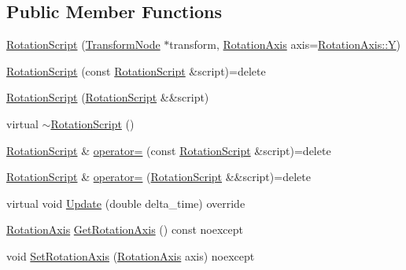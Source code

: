 \subsection*{Public Member Functions}
\begin{DoxyCompactItemize}
\item 
\hyperlink{classmage_1_1_rotation_script_a731c7c3dbe7064fe876f80307952b595}{Rotation\+Script} (\hyperlink{structmage_1_1_transform_node}{Transform\+Node} $\ast$transform, \hyperlink{classmage_1_1_rotation_script_ad06cf896ce6dfe4f6676b263d15b4ee9}{Rotation\+Axis} axis=\hyperlink{classmage_1_1_rotation_script_ad06cf896ce6dfe4f6676b263d15b4ee9a57cec4137b614c87cb4e24a3d003a3e0}{Rotation\+Axis\+::Y})
\item 
\hyperlink{classmage_1_1_rotation_script_a52ee0473609565766fc1153678ee8b60}{Rotation\+Script} (const \hyperlink{classmage_1_1_rotation_script}{Rotation\+Script} \&script)=delete
\item 
\hyperlink{classmage_1_1_rotation_script_a5c6464f8e38fde0442c3b6f49a9cbed1}{Rotation\+Script} (\hyperlink{classmage_1_1_rotation_script}{Rotation\+Script} \&\&script)
\item 
virtual \hyperlink{classmage_1_1_rotation_script_adc2af2d6ed93558fd66b569297b294d0}{$\sim$\+Rotation\+Script} ()
\item 
\hyperlink{classmage_1_1_rotation_script}{Rotation\+Script} \& \hyperlink{classmage_1_1_rotation_script_a738c666a1aa42412da82d24368b20dfe}{operator=} (const \hyperlink{classmage_1_1_rotation_script}{Rotation\+Script} \&script)=delete
\item 
\hyperlink{classmage_1_1_rotation_script}{Rotation\+Script} \& \hyperlink{classmage_1_1_rotation_script_a093aa3f50dcbbe68847bb0b5f6363e7a}{operator=} (\hyperlink{classmage_1_1_rotation_script}{Rotation\+Script} \&\&script)=delete
\item 
virtual void \hyperlink{classmage_1_1_rotation_script_a96936107b1b955cce5e84b8081f930bb}{Update} (double delta\+\_\+time) override
\item 
\hyperlink{classmage_1_1_rotation_script_ad06cf896ce6dfe4f6676b263d15b4ee9}{Rotation\+Axis} \hyperlink{classmage_1_1_rotation_script_a6fbbbec1bd610da2c917d1ef2d05f556}{Get\+Rotation\+Axis} () const noexcept
\item 
void \hyperlink{classmage_1_1_rotation_script_a32c12db9206002a1aa2dd0e2e3b4ecd7}{Set\+Rotation\+Axis} (\hyperlink{classmage_1_1_rotation_script_ad06cf896ce6dfe4f6676b263d15b4ee9}{Rotation\+Axis} axis) noexcept
\end{DoxyCompactItemize}
